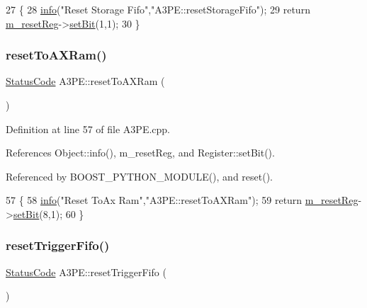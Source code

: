 \begin{DoxyCode}
27                                  \{
28   \hyperlink{classObject_a644fd329ea4cb85f54fa6846484b84a8}{info}(\textcolor{stringliteral}{"Reset Storage Fifo"},\textcolor{stringliteral}{"A3PE::resetStorageFifo"});
29   \textcolor{keywordflow}{return} \hyperlink{classA3PE_ab4db5f00976e5095686f108c8febf702}{m\_resetReg}->\hyperlink{classRegister_ab094246dd12aa7e0aa0ca917f4e70b31}{setBit}(1,1);
30 \}
\end{DoxyCode}
\mbox{\label{classA3PE_a31f72fac5a0f00bcf3a0db99bd5704ee}} 
\subsubsection{\texorpdfstring{reset\+To\+A\+X\+Ram()}{resetToAXRam()}}
{\footnotesize\ttfamily \hyperlink{classStatusCode}{Status\+Code} A3\+P\+E\+::reset\+To\+A\+X\+Ram (\begin{DoxyParamCaption}{ }\end{DoxyParamCaption})}



Definition at line 57 of file A3\+P\+E.\+cpp.



References Object\+::info(), m\+\_\+reset\+Reg, and Register\+::set\+Bit().



Referenced by B\+O\+O\+S\+T\+\_\+\+P\+Y\+T\+H\+O\+N\+\_\+\+M\+O\+D\+U\+L\+E(), and reset().


\begin{DoxyCode}
57                              \{
58   \hyperlink{classObject_a644fd329ea4cb85f54fa6846484b84a8}{info}(\textcolor{stringliteral}{"Reset ToAx Ram"},\textcolor{stringliteral}{"A3PE::resetToAXRam"});
59   \textcolor{keywordflow}{return} \hyperlink{classA3PE_ab4db5f00976e5095686f108c8febf702}{m\_resetReg}->\hyperlink{classRegister_ab094246dd12aa7e0aa0ca917f4e70b31}{setBit}(8,1);
60 \}
\end{DoxyCode}
\mbox{\label{classA3PE_ac81388bd2988192cf54034b245f69891}} 
\subsubsection{\texorpdfstring{reset\+Trigger\+Fifo()}{resetTriggerFifo()}}
{\footnotesize\ttfamily \hyperlink{classStatusCode}{Status\+Code} A3\+P\+E\+::reset\+Trigger\+Fifo (\begin{DoxyParamCaption}{ }\end{DoxyParamCaption})}




